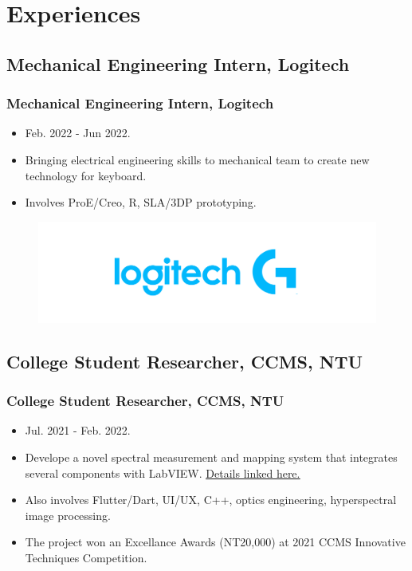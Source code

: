 \documentclass[compress]{beamer}
\begin{document}
\section{Experiences}

\subsection{Mechanical Engineering Intern, Logitech}
\begin{frame}
    \frametitle{Mechanical Engineering Intern, Logitech}
    \begin{itemize}
        \item Feb. 2022 - Jun 2022.
        \item Bringing electrical engineering skills to mechanical team to create new technology for keyboard.
        \item Involves ProE/Creo, R, SLA/3DP prototyping.
    \end{itemize}
    \begin{figure}
        \centering
        \includegraphics[width = 0.5\linewidth]{High_Resolution_JPEG-LogitechG_horz_RGB_cyan_LG.jpg}
    \end{figure}
\end{frame}

\subsection{College Student Researcher, CCMS, NTU}
\begin{frame}
    \frametitle{College Student Researcher, CCMS, NTU}
    \begin{itemize}
        \item Jul. 2021 - Feb. 2022.
        \item Develope a novel spectral measurement and mapping system that integrates several components with LabVIEW. \href{https://bencer3283.github.io/experiences/collegeStudentResearch/}{\underline{Details linked here.}}
        \item Also involves Flutter/Dart, UI/UX, C++, optics engineering, hyperspectral image processing.
        \item The project won an Excellance Awards (NT20,000) at 2021 CCMS Innovative Techniques Competition.
    \end{itemize}
\end{frame}
\end{document}
